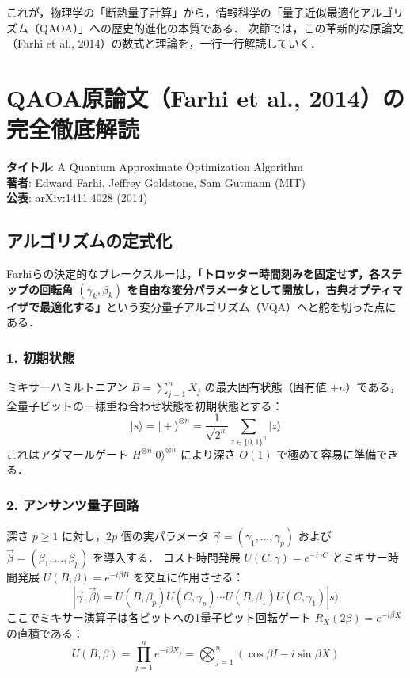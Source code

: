 \documentclass[11pt,a4paper,oneside,openany]{ltjsbook}
\theoremstyle{definition}
\theoremstyle{plain}
\theoremstyle{remark}
\newcommand{\ket}[1]{|#1\rangle}
\begin{document}
これが，物理学の「断熱量子計算」から，情報科学の「量子近似最適化アルゴリズム（QAOA）」への歴史的進化の本質である．
次節では，この革新的な原論文（Farhi et al., 2014）の数式と理論を，一行一行解読していく．

\chapter{QAOA原論文（Farhi et al., 2014）の完全徹底解読}

\begin{paperbox}[原著論文データ]
\textbf{タイトル}: A Quantum Approximate Optimization Algorithm\\
\textbf{著者}: Edward Farhi, Jeffrey Goldstone, Sam Gutmann (MIT)\\
\textbf{公表}: arXiv:1411.4028 (2014)
\end{paperbox}

\section{アルゴリズムの定式化}
Farhiらの決定的なブレークスルー\cite{farhi2014quantum}は，\textbf{「トロッター時間刻みを固定せず，各ステップの回転角 $(\gamma_k, \beta_k)$ を自由な変分パラメータとして開放し，古典オプティマイザで最適化する」}という変分量子アルゴリズム（VQA\cite{cerezo2021variational}）へと舵を切った点にある．

\subsection{1. 初期状態}
ミキサーハミルトニアン $B = \sum_{j=1}^n X_j$ の最大固有状態（固有値 $+n$）である，全量子ビットの一様重ね合わせ状態を初期状態とする：
\begin{equation}
    \ket{s} = \ket{+}^{\otimes n} = \frac{1}{\sqrt{2^n}} \sum_{z \in \{0, 1\}^n} \ket{z}
\end{equation}
これはアダマールゲート $H^{\otimes n} \ket{0}^{\otimes n}$ により深さ $O(1)$ で極めて容易に準備できる．

\subsection{2. アンサンツ量子回路}
深さ $p \ge 1$ に対し，$2p$ 個の実パラメータ $\vec{\gamma} = (\gamma_1, \dots, \gamma_p)$ および $\vec{\beta} = (\beta_1, \dots, \beta_p)$ を導入する．
コスト時間発展 $U(C, \gamma) = e^{-i \gamma C}$ とミキサー時間発展 $U(B, \beta) = e^{-i \beta B}$ を交互に作用させる：
\begin{equation}
    \ket{\vec{\gamma}, \vec{\beta}} = U(B, \beta_p) U(C, \gamma_p) \cdots U(B, \beta_1) U(C, \gamma_1) \ket{s}
\end{equation}
ここでミキサー演算子は各ビットへの1量子ビット回転ゲート $R_X(2\beta) = e^{-i \beta X}$ の直積である：
\begin{equation}
    U(B, \beta) = \prod_{j=1}^n e^{-i \beta X_j} = \bigotimes_{j=1}^n (\cos\beta I - i \sin\beta X)
\end{equation}
\end{document}
